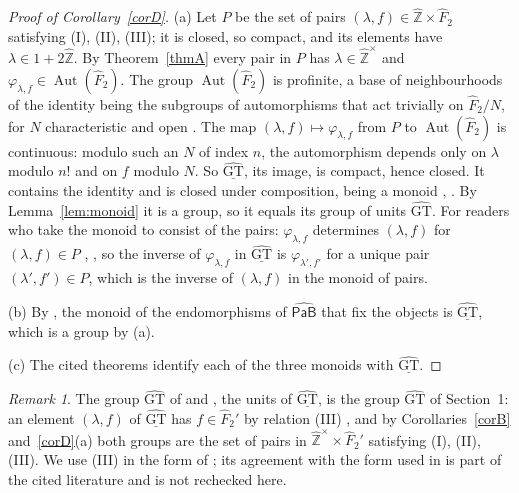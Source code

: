 \documentclass[11pt]{amsart}
\theoremstyle{definition}
\theoremstyle{remark}
\newtheorem{remark}[thm]{Remark}
\newcommand{\Zh}{\widehat{\mathbb Z}}
\newcommand{\Fh}{\widehat F}
\newcommand{\GT}{\widehat{\mathrm{GT}}}
\newcommand{\GTm}{\underline{\widehat{\mathrm{GT}}}}
\newcommand{\PaBh}{\widehat{\mathsf{PaB}}}
\newcommand{\Aut}{\operatorname{Aut}}
\newcommand{\ph}{\varphi}
\begin{document}
\begin{proof}[Proof of Corollary~\ref{corD}]
(a) Let $P$ be the set of pairs $(\lambda,f)\in\Zh\times\Fh_2$ satisfying (I), (II), (III); it is closed, so compact, and its elements have $\lambda\in1+2\Zh$. By Theorem~\ref{thmA} every pair in $P$ has $\lambda\in\Zh^\times$ and $\ph_{\lambda,f}\in\Aut(\Fh_2)$. The group $\Aut(\Fh_2)$ is profinite, a base of neighbourhoods of the identity being the subgroups of automorphisms that act trivially on $\Fh_2/N$, for $N$ characteristic and open \cite[\S4.4]{RZ}. The map $(\lambda,f)\mapsto\ph_{\lambda,f}$ from $P$ to $\Aut(\Fh_2)$ is continuous: modulo such an $N$ of index $n$, the automorphism depends only on $\lambda$ modulo $n!$ and on $f$ modulo $N$. So $\GTm$, its image, is compact, hence closed. It contains the identity and is closed under composition, being a monoid \cite[Definition~7.1]{Hor}, \cite[Definition~7.2]{BHR}. By Lemma~\ref{lem:monoid} it is a group, so it equals its group of units $\GT$. For readers who take the monoid to consist of the pairs: $\ph_{\lambda,f}$ determines $(\lambda,f)$ for $(\lambda,f)\in P$ \cite[Definition~7.2]{BHR}, \cite[Lemma~7.5 and Proposition~7.4]{Hor}, so the inverse of $\ph_{\lambda,f}$ in $\GTm$ is $\ph_{\lambda',f'}$ for a unique pair $(\lambda',f')\in P$, which is the inverse of $(\lambda,f)$ in the monoid of pairs.

(b) By \cite[Proposition~7.3]{BHR}, the monoid of the endomorphisms of $\PaBh$ that fix the objects is $\GTm$, which is a group by (a).

(c) The cited theorems identify each of the three monoids with $\GTm$.
\end{proof}

\begin{remark}\label{rem:classical}
The group $\GT$ of \cite{Hor} and \cite{BHR}, the units of $\GTm$, is the group $\GT$ of Section~1: an element $(\lambda,f)$ of $\GTm$ has $f\in\Fh_2'$ by relation (III) \cite[Proposition~7.4]{Hor}, and by Corollaries~\ref{corB} and~\ref{corD}(a) both groups are the set of pairs in $\Zh^\times\times\Fh_2'$ satisfying (I), (II), (III). We use (III) in the form of \cite[Definition~7.2]{BHR}; its agreement with the form used in \cite{LS} is part of the cited literature and is not rechecked here.
\end{remark}
\end{document}

